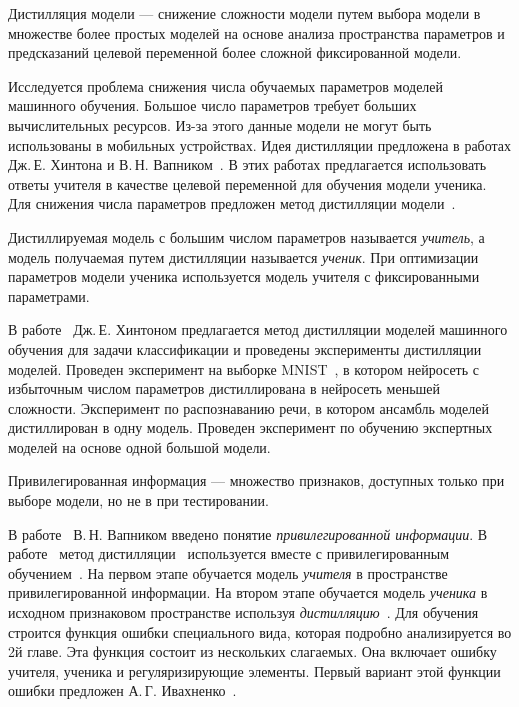 \begin{definition}
Дистилляция модели --- снижение сложности модели путем выбора модели в множестве более простых моделей на основе анализа пространства параметров и предсказаний целевой переменной более сложной фиксированной модели.
\end{definition}

Исследуется проблема снижения числа обучаемых параметров моделей машинного обучения.
Большое число параметров требует больших вычислительных ресурсов.
Из-за этого данные модели не могут быть использованы в мобильных устройствах.
Идея дистилляции предложена в работах Дж.\,Е. Хинтона и В.\,Н. Вапником~\cite{Hinton2015, Vapnik2015, Lopez2016}. В этих работах предлагается использовать ответы учителя в качестве целевой переменной для обучения модели ученика.
Для снижения числа параметров предложен метод дистилляции модели~\cite{Hinton2015, Vapnik2015, Lopez2016}.

Дистиллируемая модель с большим числом параметров называется \textit{учитель}, а модель получаемая путем дистилляции называется \textit{ученик}.
При оптимизации параметров модели ученика используется модель учителя с фиксированными параметрами.

В работе~\cite{Hinton2015} Дж.\,Е. Хинтоном предлагается метод дистилляции моделей машинного обучения для задачи классификации и проведены эксперименты дистилляции моделей. Проведен эксперимент на выборке MNIST~\cite{mnist}, в котором нейросеть с избыточным числом параметров дистиллирована в нейросеть меньшей сложности. Эксперимент по распознаванию речи, в котором ансамбль моделей дистиллирован в одну модель. Проведен эксперимент по обучению экспертных моделей на основе одной большой модели.

\begin{definition}
Привилегированная информация --- множество признаков, доступных только при выборе модели, но не в при тестировании.
\end{definition}

В работе~\cite{Vapnik2015} В.\,Н. Вапником введено понятие \textit{привилегированной информации}. В работе~\cite{Lopez2016} метод дистилляции~\cite{Hinton2015} используется вместе с привилегированным обучением~\cite{Vapnik2015}. На первом этапе обучается модель \textit{учителя} в пространстве привилегированной информации. На втором этапе обучается модель \textit{ученика} в исходном признаковом пространстве используя \textit{дистилляцию}~\cite{Hinton2015}. Для обучения строится функция ошибки специального вида, которая подробно анализируется во 2й главе. Эта функция состоит из нескольких слагаемых. Она включает ошибку учителя, ученика и регуляризирующие элементы. Первый вариант этой функции ошибки предложен А.\,Г. Ивахненко~\cite{Ivakhnenko1994}.

